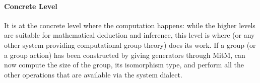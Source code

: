 \paragraph{Concrete Level}
It is at the concrete level where the computation happens: while the higher levels
are suitable for mathematical deduction and inference, this level is where \GAP
(or any other system providing computational group theory) does its work.
If a group (or a group action) has been constructed by giving generators
through MitM, \GAP can now compute the size of the group, its isomorphism type,
and perform all the other operations that are available via the \GAP system
dialect.

%
%
%
%
%

